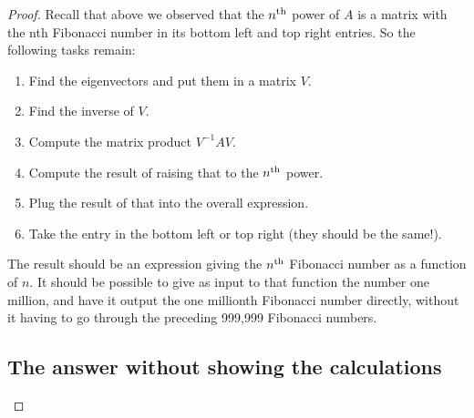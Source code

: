 \begin{proof}
Recall that above we observed that the $n^{\text{th}}$ power of $A$ is a matrix with the
nth Fibonacci number in its bottom left and top right entries. So the following
tasks remain:
\begin{enumerate}
\item Find the eigenvectors and put them in a matrix $V$.
\item Find the inverse of $V$.
\item Compute the matrix product $V^{-1}AV$.
\item Compute the result of raising that to the $n^{\text{th}}$ power.
\item Plug the result of that into the overall expression.
\item Take the entry in the bottom left or top right (they should be the same!).
\end{enumerate}

The result should be an expression giving the $n^{\text{th}}$ Fibonacci number as a
function of $n$. It should be possible to give as input to that function the
number one million, and have it output the one millionth Fibonacci number
directly, without it having to go through the preceding 999,999 Fibonacci
numbers.


\subsection*{The answer without showing the calculations}


\end{proof}
